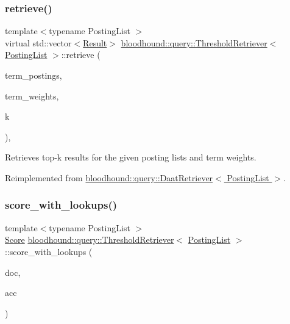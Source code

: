 \subsubsection{\texorpdfstring{retrieve()}{retrieve()}}
{\footnotesize\ttfamily template$<$typename Posting\+List $>$ \\
virtual std\+::vector$<$\hyperlink{structbloodhound_1_1query_1_1Result}{Result}$>$ \hyperlink{classbloodhound_1_1query_1_1ThresholdRetriever}{bloodhound\+::query\+::\+Threshold\+Retriever}$<$ \hyperlink{classbloodhound_1_1PostingList}{Posting\+List} $>$\+::retrieve (\begin{DoxyParamCaption}\item[{const std\+::vector$<$ \hyperlink{classbloodhound_1_1PostingList}{Posting\+List} $>$ \&}]{term\+\_\+postings,  }\item[{const std\+::vector$<$ \hyperlink{structbloodhound_1_1Score}{Score} $>$ \&}]{term\+\_\+weights,  }\item[{std\+::size\+\_\+t}]{k }\end{DoxyParamCaption})\hspace{0.3cm}{\ttfamily [inline]}, {\ttfamily [virtual]}}



Retrieves top-\/k results for the given posting lists and term weights. 



Reimplemented from \hyperlink{classbloodhound_1_1query_1_1DaatRetriever_ab80b4867fc263827dc2fdbe0965a2e8c}{bloodhound\+::query\+::\+Daat\+Retriever$<$ Posting\+List $>$}.

\mbox{\label{classbloodhound_1_1query_1_1ThresholdRetriever_ac0a8731d270c477e04f24b89850a7d4a}} 
\subsubsection{\texorpdfstring{score\+\_\+with\+\_\+lookups()}{score\_with\_lookups()}}
{\footnotesize\ttfamily template$<$typename Posting\+List $>$ \\
\hyperlink{structbloodhound_1_1Score}{Score} \hyperlink{classbloodhound_1_1query_1_1ThresholdRetriever}{bloodhound\+::query\+::\+Threshold\+Retriever}$<$ \hyperlink{classbloodhound_1_1PostingList}{Posting\+List} $>$\+::score\+\_\+with\+\_\+lookups (\begin{DoxyParamCaption}\item[{\hyperlink{structbloodhound_1_1Doc}{Doc}}]{doc,  }\item[{std\+::vector$<$ \hyperlink{structbloodhound_1_1Score}{Score} $>$ \&}]{acc }\end{DoxyParamCaption})\hspace{0.3cm}{\ttfamily [inline]}}

